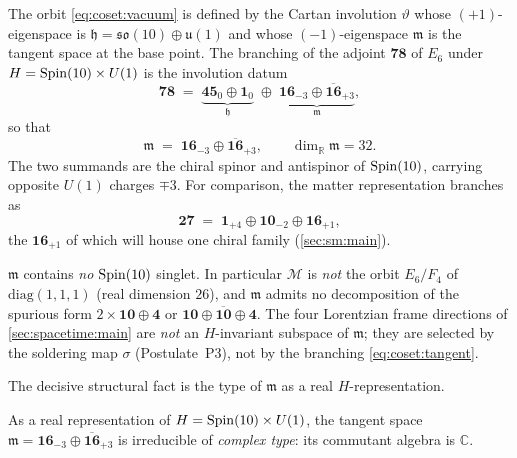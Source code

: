 The orbit \eqref{eq:coset:vacuum} is defined by the Cartan involution
$\vartheta$ whose $(+1)$-eigenspace is $\mathfrak h = \mathfrak{so}(10)\oplus
\mathfrak u(1)$ and whose $(-1)$-eigenspace $\mathfrak m$ is the tangent space at
the base point. The branching of the adjoint $\mathbf{78}$ of $E_{6}$ under
$H = \operatorname{Spin}(10)\times U(1)$ is the involution datum
\begin{equation}\label{eq:coset:adjoint}
  \mathbf{78}
  \;=\; \underbrace{\mathbf{45}_{0}\oplus\mathbf 1_{0}}_{\mathfrak h}
       \;\oplus\;
        \underbrace{\mathbf{16}_{-3}\oplus\overline{\mathbf{16}}_{+3}}_{\mathfrak m},
\end{equation}
so that
\begin{equation}\label{eq:coset:tangent}
  \mathfrak m \;=\; \mathbf{16}_{-3}\oplus\overline{\mathbf{16}}_{+3},
  \qquad \dim_{\mathbb R}\mathfrak m = 32 .
\end{equation}
The two summands are the chiral spinor and antispinor of $\operatorname{Spin}(10)$, carrying
opposite $U(1)$ charges $\mp 3$. For comparison, the matter representation
branches as
\begin{equation}\label{eq:coset:fund}
  \mathbf{27} \;=\; \mathbf 1_{+4}\oplus\mathbf{10}_{-2}\oplus\mathbf{16}_{+1},
\end{equation}
the $\mathbf{16}_{+1}$ of which will house one chiral family
(\autoref{sec:sm:main}).

\begin{remark}\label{rem:coset:nosinglet}
$\mathfrak m$ contains \emph{no} $\operatorname{Spin}(10)$ singlet. In particular $\mathcal M$
is \emph{not} the orbit $E_{6}/F_{4}$ of $\mathrm{diag}(1,1,1)$ (real dimension
$26$), and $\mathfrak m$ admits no decomposition of the spurious form
$2\times\mathbf{10}\oplus\mathbf 4$ or $\mathbf{10}\oplus\overline{\mathbf{10}}
\oplus\mathbf 4$. The four Lorentzian frame directions of
\autoref{sec:spacetime:main} are \emph{not} an $H$-invariant subspace of
$\mathfrak m$; they are selected by the soldering map $\sigma$ (Postulate~P3),
not by the branching \eqref{eq:coset:tangent}.
\end{remark}

The decisive structural fact is the type of $\mathfrak m$ as a real
$H$-representation.

\begin{theorem}\label{thm:coset:irrep}
As a real representation of $H = \operatorname{Spin}(10)\times U(1)$, the tangent space
$\mathfrak m = \mathbf{16}_{-3}\oplus\overline{\mathbf{16}}_{+3}$ is irreducible
of \emph{complex type}: its commutant algebra is $\mathbb C$.
\end{theorem}

